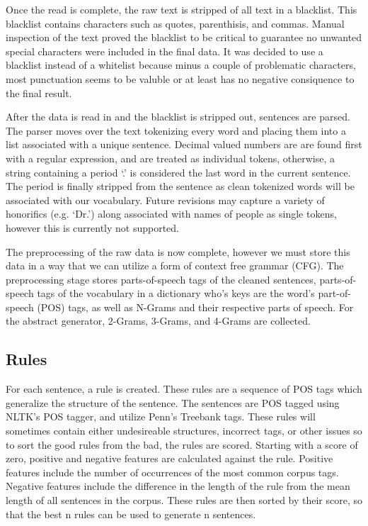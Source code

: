 \documentclass[letterpaper, 10 pt, conference]{ieeeconf}  %
\begin{document}
Once the read is complete, the raw text is stripped of all text in a blacklist. This blacklist contains characters such as quotes, parenthisis, and commas. Manual inspection of the text proved the blacklist to be critical to guarantee no unwanted special characters were included in the final data. It was decided to use a blacklist instead of a whitelist because minus a couple of problematic characters, most punctuation seems to be valuble or at least has no negative consiquence to the final result.

After the data is read in and the blacklist is stripped out, sentences are parsed. The parser moves over the text tokenizing every word and placing them into a list associated with a unique sentence. Decimal valued numbers are are found first with a regular expression, and are treated as individual tokens, otherwise, a string containing a period ‘.’ is considered the last word in the current sentence. The period is finally stripped from the sentence as clean tokenized words will be associated with our vocabulary. Future revisions may capture a variety of honorifics (e.g. ‘Dr.’) along associated with names of people as single tokens, however this is currently not supported.

The preprocessing of the raw data is now complete, however we must store this data in a way that we can utilize a form of context free grammar (CFG). The preprocessing stage stores parts-of-speech tags of the cleaned sentences, parts-of-speech tags of the vocabulary in a dictionary who's keys are the word's part-of-speech (POS) tags, as well as N-Grams and their respective parts of speech. For the abstract generator, 2-Grams, 3-Grams, and 4-Grams are collected.

\subsection{Rules}

For each sentence, a rule is created. These rules are a sequence of POS tags which generalize the structure of the sentence. The sentences are POS tagged using NLTK's POS tagger, and utilize Penn's Treebank tags. These rules will sometimes contain either undesireable structures, incorrect tags, or other issues so to sort the good rules from the bad, the rules are scored. Starting with a score of zero, positive and negative features are calculated against the rule. Positive features include the number of occurrences of the most common corpus tags. Negative features include the difference in the length of the rule from the mean length of all sentences in the corpus. These rules are then sorted by their score, so that the best n rules can be used to generate n sentences.
\end{document}
